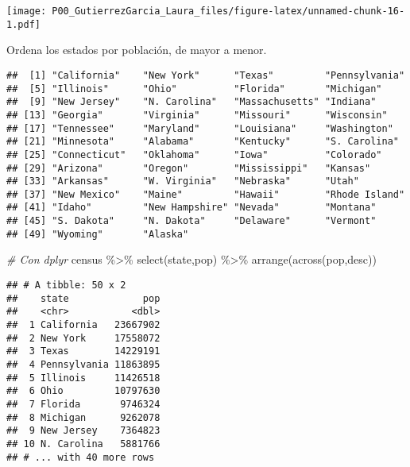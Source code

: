 \documentclass[
]{article}
\newenvironment{Shaded}{\begin{snugshade}}{\end{snugshade}}
\newcommand{\AttributeTok}[1]{\textcolor[rgb]{0.77,0.63,0.00}{#1}}
\newcommand{\CommentTok}[1]{\textcolor[rgb]{0.56,0.35,0.01}{\textit{#1}}}
\newcommand{\ConstantTok}[1]{\textcolor[rgb]{0.00,0.00,0.00}{#1}}
\newcommand{\FunctionTok}[1]{\textcolor[rgb]{0.00,0.00,0.00}{#1}}
\newcommand{\NormalTok}[1]{#1}
\newcommand{\SpecialCharTok}[1]{\textcolor[rgb]{0.00,0.00,0.00}{#1}}
\begin{document}
\texttt{[image: P00\_GutierrezGarcia\_Laura\_files/figure-latex/unnamed-chunk-16-1.pdf]}

Ordena los estados por población, de mayor a menor.

\begin{Shaded}
\end{Shaded}

\begin{verbatim}
##  [1] "California"    "New York"      "Texas"         "Pennsylvania" 
##  [5] "Illinois"      "Ohio"          "Florida"       "Michigan"     
##  [9] "New Jersey"    "N. Carolina"   "Massachusetts" "Indiana"      
## [13] "Georgia"       "Virginia"      "Missouri"      "Wisconsin"    
## [17] "Tennessee"     "Maryland"      "Louisiana"     "Washington"   
## [21] "Minnesota"     "Alabama"       "Kentucky"      "S. Carolina"  
## [25] "Connecticut"   "Oklahoma"      "Iowa"          "Colorado"     
## [29] "Arizona"       "Oregon"        "Mississippi"   "Kansas"       
## [33] "Arkansas"      "W. Virginia"   "Nebraska"      "Utah"         
## [37] "New Mexico"    "Maine"         "Hawaii"        "Rhode Island" 
## [41] "Idaho"         "New Hampshire" "Nevada"        "Montana"      
## [45] "S. Dakota"     "N. Dakota"     "Delaware"      "Vermont"      
## [49] "Wyoming"       "Alaska"
\end{verbatim}

\begin{Shaded}
\begin{Highlighting}[]
\CommentTok{\# Con dplyr}
\NormalTok{census }\SpecialCharTok{\%\textgreater{}\%} 
  \FunctionTok{select}\NormalTok{(state,pop) }\SpecialCharTok{\%\textgreater{}\%} 
  \FunctionTok{arrange}\NormalTok{(}\FunctionTok{across}\NormalTok{(pop,desc))}
\end{Highlighting}
\end{Shaded}

\begin{verbatim}
## # A tibble: 50 x 2
##    state             pop
##    <chr>           <dbl>
##  1 California   23667902
##  2 New York     17558072
##  3 Texas        14229191
##  4 Pennsylvania 11863895
##  5 Illinois     11426518
##  6 Ohio         10797630
##  7 Florida       9746324
##  8 Michigan      9262078
##  9 New Jersey    7364823
## 10 N. Carolina   5881766
## # ... with 40 more rows
\end{verbatim}
\end{document}
